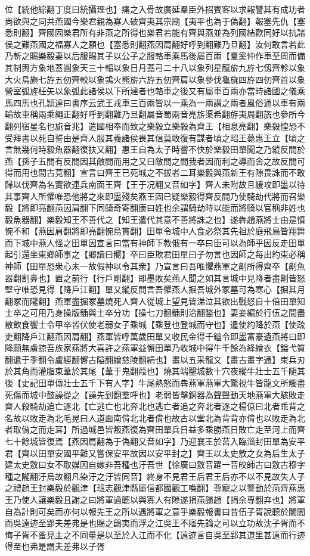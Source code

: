 位【統他綜翻丁度曰統攝理也】痛之入骨故廣延羣臣外招賓客以求報讐其有成功者尚欲與之同共燕國今樂君親為寡人破齊夷其宗廟【夷平也為于偽翻】報塞先仇【塞悉則翻】齊國固樂君所有非燕之所得也樂君若能有齊與燕並為列國結歡同好以抗諸侯之難燕國之福寡人之願也【塞悉則翻燕因肩翻好呼到翻難乃旦翻】汝何敢言若此乃斬之賜樂毅妻以后服賜其子以公子之服輅車乘馬後屬百兩【夏奚仲作車至周而備其制輿方象地蓋圓象天三十輻以象日月蓋弓二十八以象列星龍旂九斿七仭齊軫以象大火鳥旟七斿五仞齊較以象鶉火熊旂六斿五仞齊肩以象參伐龜旐四斿四仞齊首以象營室弧旌枉矢以象弧此諸侯以下所建者也輅車之後又有屬車百兩亦當時諸國之儀乘馬四馬也孔頴達曰書序云武王戎車三百兩皆以一乘為一兩謂之兩者風俗通以車有兩輪故車稱兩乘繩正翻好呼到翻難乃旦翻屬音蜀兩音亮旂渠希翻斿夷周翻旒也參所今翻列宿星名也旐音兆】遣國相奉而致之樂毅立樂毅為齊王【相息亮翻】樂毅惶恐不受拜書以死自誓由是齊人服其義諸侯畏其信莫敢復有謀者頃之昭王薨惠王立【頃之言無幾何時毅魚器翻復扶又翻】惠王自為太子時嘗不快於樂毅田單聞之乃縱反間於燕【孫子五間有反間因其敵間而用之又曰敵間之間我者因而利之導而舍之故反間可得而用也間古莧翻】宣言曰齊王已死城之不拔者二耳樂毅與燕新王有隙畏誅而不敢歸以伐齊為名實欲連兵南面王齊【王于况翻又音如字】齊人未附故且緩攻即墨以待其事齊人所懼唯恐他將之來即墨殘矣燕王固已疑樂毅得齊反間乃使騎劫代將而召樂毅【將即亮翻燕因肩翻下同騎奇寄翻康曰姓也余謂騎劫時以能而將騎以官稱非姓也毅魚器翻】樂毅知王不善代之【知王遣代其意不善將誅之也】遂犇趙燕將士由是憤惋不和【燕因肩翻將即亮翻惋烏貫翻】田單令城中人食必祭其先祖於庭飛鳥皆翔舞而下城中燕人怪之田單因宣言曰當有神師下教俄有一卒曰臣可以為師乎因反走田單起引還坐東鄉師事之【鄉讀曰嚮】卒曰臣欺君田單曰子勿言也因師之每出約束必稱神師【田單恐衆心未一故假神以令其衆】乃宣言曰吾唯懼燕軍之劓所得齊卒【劓魚器翻割鼻也】置之前行【行戶剛翻】即墨敗矣燕人聞之如其言城中見降者盡劓皆怒堅守唯恐見得【降戶江翻】單又縱反間言吾懼燕人掘吾城外冢墓可為寒心【掘其月翻冢而隴翻】燕軍盡掘冢墓燒死人齊人從城上望見皆涕泣其欲出戰怒自十倍田單知士卒之可用乃身操版鍤與士卒分功【操七刀翻鍤則洽翻鍫也】妻妾編於行伍之間盡散飲食饗士令甲卒皆伏使老弱女子乘城【乘登也登城而守也】遣使約降於燕【使疏吏翻降戶江翻燕因肩翻】燕軍皆呼萬歲田單又收民金得千鎰令即墨富豪遺燕將曰即降願無虜掠吾族家燕將大喜許之燕軍益懈田單乃收城中得牛千餘為絳繒衣【鎰弋質翻遺于季翻令盧經翻懈古隘翻繒慈陵翻絹也】畫以五采龍文【畫古畫字通】束兵刃於其角而灌脂束葦於其尾【葦于鬼翻葭也】燒其端鑿城數十穴夜縱牛壯士五千隨其後【史記田單傳壯士五千下有人字】牛尾熱怒而犇燕軍燕軍大驚視牛皆龍文所觸盡死傷而城中鼓譟從之【譟先到翻羣呼也】老弱皆擊銅器為聲聲動天地燕軍大駭敗走齊人殺騎劫追亡逐北【亡逃亡也北奔北也逃亡者追之奔北者逐之楊倞曰北者乖背之名故以敗走為北毛晃曰人道面南偝北北者偝也故古以堂北為背背亦偝也以敗走為北者取偝之而走耳】所過城邑皆叛燕復為齊田單兵日益多乘勝燕日敗亡走至河上而齊七十餘城皆復焉【燕因肩翻為于偽翻又音如字】乃迎襄王於莒入臨淄封田單為安平君【齊以田單安國平難又嘗保安平故因以安平封之】齊王以太史敫之女為后生太子建太史敫曰女不取媒因自嫁非吾種也汙吾世【徐廣曰敫音躍一音皎師古曰敫古穆字種之隴翻汙烏故翻凡染汙之汙皆同音】終身不見君王后君王后亦不以不見故失人子之禮趙王封樂毅於觀津【班志觀津縣屬信都國觀工喚翻】尊寵之以警動於燕齊燕惠王乃使人讓樂毅且謝之曰將軍過聼以與寡人有隙遂捐燕歸趙【捐余專翻弃也】將軍自為計則可矣而亦何以報先王之所以遇將軍之意乎樂毅報書曰昔伍子胥說聼於闔閭而吳遠迹至郢夫差弗是也賜之鴟夷而浮之江吳王不寤先論之可以立功故沈子胥而不悔子胥不蚤見主之不同量是以至於入江而不化【遠迹言自吳至郢其道里甚遠而行迹得至也弗是謂夫差弗以子胥